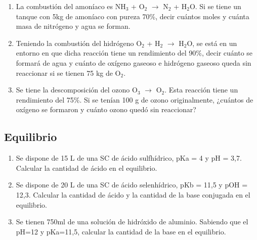 \begin{enumerate}
\item La combustión del amoníaco es NH$_3$ + O$_2$ $\longrightarrow$ N$_2$ + H$_2$O. Si se tiene un tanque con 5kg de amoníaco con pureza 70\%, decir cuántos moles y cuánta masa de nitrógeno y agua se forman.

\item Teniendo la combustión del hidrógeno O$_2$ + H$_2$ $\longrightarrow$ H$_2$O, se está en un entorno en que dicha reacción tiene un rendimiento del 90\%, decir cuánto se formará de agua y cuánto de oxígeno gaseoso e hidrógeno gaseoso queda sin reaccionar si se tienen 75 kg de O$_2$.

\item Se tiene la descomposición del ozono O$_3$ $\longrightarrow$ O$_2$. Esta reacción tiene un rendimiento del 75\%. Si se tenían 100 g de ozono originalmente, ¿cuántos de oxígeno se formaron y cuánto ozono quedó sin reaccionar?
    
\end{enumerate}

\subsection*{Equilibrio}

\begin{enumerate}
    \item Se dispone de 15 L de una SC de ácido sulfhídrico, pKa = 4 y pH = 3,7. Calcular la cantidad de ácido en el equilibrio.
    \item Se dispone de 20 L de una SC de ácido selenhídrico, pKb = 11,5 y pOH = 12,3. Calcular la cantidad de ácido y la cantidad de la base conjugada en el equilibrio.
    \item Se tienen 750ml de una solución de hidróxido de aluminio. Sabiendo que el pH=12 y pKa=11,5, calcular la cantidad de la base en el equilibrio.
\end{enumerate}